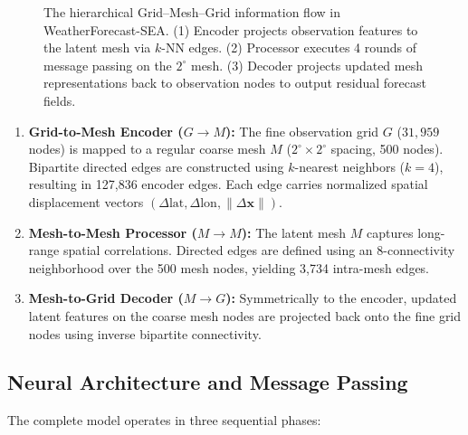 \begin{figure}[!t]
\centering
{}
\caption{The hierarchical Grid--Mesh--Grid information flow in WeatherForecast-SEA. (1) Encoder projects observation features to the latent mesh via $k$-NN edges. (2) Processor executes 4 rounds of message passing on the $2^\circ$ mesh. (3) Decoder projects updated mesh representations back to observation nodes to output residual forecast fields.}
\label{fig:arch}
\end{figure}

\begin{enumerate}
    \item \textbf{Grid-to-Mesh Encoder ($G \to M$):} The fine observation grid $G$ ($31,959$ nodes) is mapped to a regular coarse mesh $M$ ($2^\circ \times 2^\circ$ spacing, 500 nodes). Bipartite directed edges are constructed using $k$-nearest neighbors ($k=4$), resulting in 127,836 encoder edges. Each edge carries normalized spatial displacement vectors $(\Delta \text{lat}, \Delta \text{lon}, \|\Delta\mathbf{x}\|)$.
    \item \textbf{Mesh-to-Mesh Processor ($M \to M$):} The latent mesh $M$ captures long-range spatial correlations. Directed edges are defined using an 8-connectivity neighborhood over the 500 mesh nodes, yielding 3,734 intra-mesh edges.
    \item \textbf{Mesh-to-Grid Decoder ($M \to G$):} Symmetrically to the encoder, updated latent features on the coarse mesh nodes are projected back onto the fine grid nodes using inverse bipartite connectivity.
\end{enumerate}

\subsection{Neural Architecture and Message Passing}
The complete model operates in three sequential phases:

